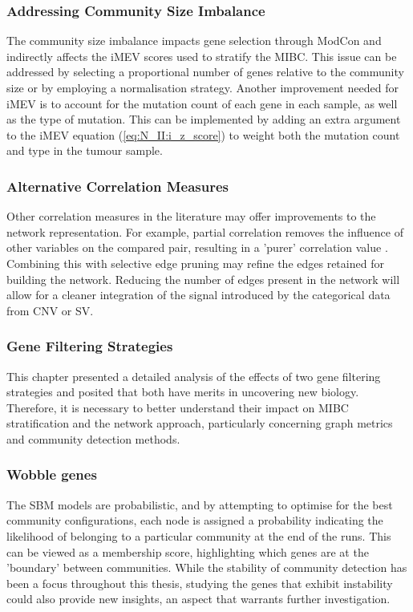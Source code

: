 \subsubsection*{Addressing Community Size Imbalance}

The community size imbalance impacts gene selection through ModCon and indirectly affects the iMEV scores used to stratify the MIBC. This issue can be addressed by selecting a proportional number of genes relative to the community size or by employing a normalisation strategy. Another improvement needed for iMEV is to account for the mutation count of each gene in each sample, as well as the type of mutation. This can be implemented by adding an extra argument to the iMEV equation (\cref{eq:N_II:i_z_score}) to weight both the mutation count and type in the tumour sample.


\subsubsection*{Alternative Correlation Measures}

Other correlation measures in the literature may offer improvements to the network representation. For example, partial correlation removes the influence of other variables on the compared pair, resulting in a 'purer' correlation value \citep{De_la_Fuente2004-ts}. Combining this with selective edge pruning may refine the edges retained for building the network. Reducing the number of edges present in the network will allow for a cleaner integration of the signal introduced by the categorical data from CNV or SV.

\subsubsection*{Gene Filtering Strategies}

This chapter presented a detailed analysis of the effects of two gene filtering strategies and posited that both have merits in uncovering new biology. Therefore, it is necessary to better understand their impact on MIBC stratification and the network approach, particularly concerning graph metrics and community detection methods. 

\subsubsection*{Wobble genes}

The SBM models are probabilistic, and by attempting to optimise for the best community configurations, each node is assigned a probability indicating the likelihood of belonging to a particular community at the end of the runs. This can be viewed as a membership score, highlighting which genes are at the 'boundary' between communities. While the stability of community detection has been a focus throughout this thesis, studying the genes that exhibit instability could also provide new insights, an aspect that warrants further investigation.

